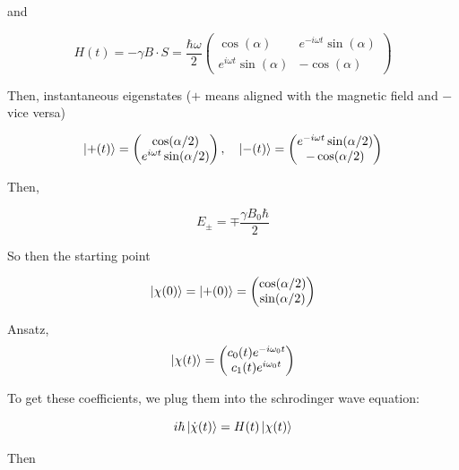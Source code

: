 \documentclass{article}
\newtheorem{one minute paper}[theorem]{One Minute Paper}
\begin{document}
and 

\begin{equation}
    H(t) = -\gamma B \cdot S = \frac{\hbar \omega}{2}\begin{pmatrix}
        \cos(\alpha) & e^{-i\omega t}\sin(\alpha) \\
        e^{i\omega t}\sin(\alpha) & -\cos(\alpha)
    \end{pmatrix}
\end{equation}

Then, instantaneous eigenstates ($+$ means aligned with the magnetic field and $-$ vice versa)

\begin{equation}
    \ket{+(t)} = \begin{pmatrix}
        \cos(\alpha/2)\\
        e^{i\omega t}\sin(\alpha/2)
    \end{pmatrix}, \quad \ket{-(t)} = \begin{pmatrix}
        e^{-i \omega t}\sin(\alpha/2) \\
        -\cos(\alpha/2)
    \end{pmatrix}
\end{equation}

Then, 

\begin{equation}
    E_{\pm} = \mp\frac{\gamma B_0 \hbar}{2}
\end{equation}

So then the starting point

\begin{equation}
    \ket{\chi(0)} = \ket{+(0)} = \begin{pmatrix}
        \cos(\alpha/2) \\
        \sin(\alpha/2)
    \end{pmatrix}
\end{equation}

Ansatz, $$\ket{\chi(t)} = \begin{pmatrix}
    c_0(t)e^{-i\omega_0 t} \\
    c_1(t)e^{i \omega_0t}
\end{pmatrix}$$

To get these coefficients, we plug them into the schrodinger wave equation:

\begin{equation}
    i\hbar \ket{\dot{\chi}(t)} = H(t)\ket{\chi(t)}
\end{equation}

Then 
\end{document}
